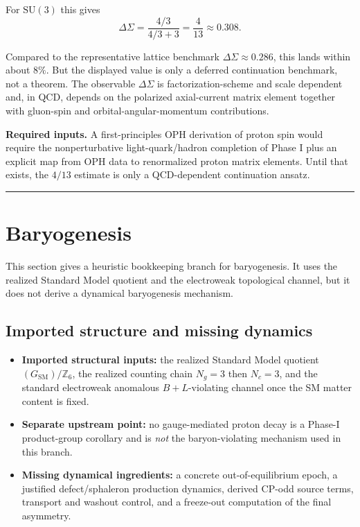 For \(\mathrm{SU}(3)\) this gives
\[
\Delta\Sigma = \frac{4/3}{4/3 + 3} = \frac{4}{13} \approx 0.308.
\]

Compared to the representative lattice benchmark \(\Delta\Sigma \approx 0.286\), this lands within about \(8\%\). But the displayed value is only a deferred continuation benchmark, not a theorem. The observable \(\Delta\Sigma\) is factorization-scheme and scale dependent and, in QCD, depends on the polarized axial-current matrix element together with gluon-spin and orbital-angular-momentum contributions.

\textbf{Required inputs.} A first-principles OPH derivation of proton spin would require the nonperturbative light-quark/hadron completion of Phase I plus an explicit map from OPH data to renormalized proton matrix elements. Until that exists, the \(4/13\) estimate is only a QCD-dependent continuation ansatz.

\begin{center}\rule{0.5\linewidth}{0.5pt}\end{center}

\section{Baryogenesis}\label{11-baryogenesis}

This section gives a heuristic bookkeeping branch for baryogenesis. It uses the realized Standard Model quotient and the electroweak topological channel, but it does not derive a dynamical baryogenesis mechanism.

\subsection{Imported structure and missing dynamics}

\begin{itemize}
\tightlist
\item
 \textbf{Imported structural inputs:} the realized Standard Model quotient \((G_{\text{SM}})/\mathbb{Z}_6\), the realized counting chain \(N_g = 3\) then \(N_c = 3\), and the standard electroweak anomalous \(B+L\)-violating channel once the SM matter content is fixed.
\item
 \textbf{Separate upstream point:} no gauge-mediated proton decay is a Phase-I product-group corollary and is \emph{not} the baryon-violating mechanism used in this branch.
\item
 \textbf{Missing dynamical ingredients:} a concrete out-of-equilibrium epoch, a justified defect/sphaleron production dynamics, derived CP-odd source terms, transport and washout control, and a freeze-out computation of the final asymmetry.
\end{itemize}

